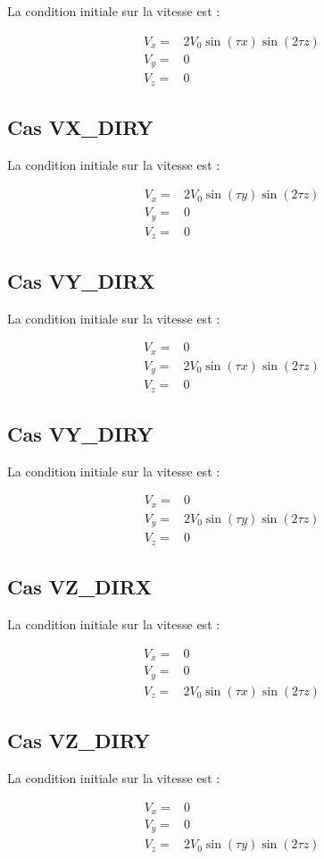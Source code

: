 La condition initiale sur la vitesse est :

\begin{align*}
V_x ={}& 2 V_0 \sin(\tau x) \sin(2 \tau z) \\
V_y ={}& 0 \\
V_z ={}& 0
\end{align*}

\subsection{Cas VX\_DIRY}

La condition initiale sur la vitesse est :

\begin{align*}
V_x ={}& 2 V_0 \sin(\tau y) \sin(2 \tau z) \\
V_y ={}& 0 \\
V_z ={}& 0
\end{align*}

\subsection{Cas VY\_DIRX}

La condition initiale sur la vitesse est :

\begin{align*}
V_x ={}& 0 \\
V_y ={}& 2 V_0 \sin(\tau x) \sin(2 \tau z) \\
V_z ={}& 0
\end{align*}

\subsection{Cas VY\_DIRY}

La condition initiale sur la vitesse est :

\begin{align*}
V_x ={}& 0 \\
V_y ={}& 2 V_0 \sin(\tau y) \sin(2 \tau z) \\
V_z ={}& 0
\end{align*}

\subsection{Cas VZ\_DIRX}

La condition initiale sur la vitesse est :

\begin{align*}
V_x ={}& 0 \\
V_y ={}& 0 \\
V_z ={}& 2 V_0 \sin(\tau x) \sin(2 \tau z)
\end{align*}

\subsection{Cas VZ\_DIRY}

La condition initiale sur la vitesse est :

\begin{align*}
V_x ={}& 0 \\
V_y ={}& 0 \\
V_z ={}& 2 V_0 \sin(\tau y) \sin(2 \tau z)
\end{align*}

